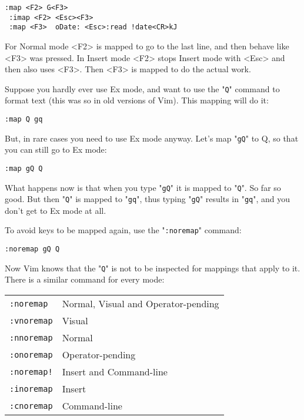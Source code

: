\begin{Verbatim}[samepage=true]
 :map <F2> G<F3>
 :imap <F2> <Esc><F3>
 :map <F3>  oDate: <Esc>:read !date<CR>kJ
\end{Verbatim}

For Normal mode <F2> is mapped to go to the last line, and then behave like <F3> was pressed.
In Insert mode <F2> stops Insert mode with <Esc> and then also uses <F3>.
Then <F3> is mapped to do the actual work.

Suppose you hardly ever use Ex mode, and want to use the "\texttt{Q}" command to format text (this was so in old versions of Vim).
This mapping will do it:

\begin{Verbatim}[samepage=true]
 :map Q gq
\end{Verbatim}

But, in rare cases you need to use Ex mode anyway.
Let's map "\texttt{gQ}" to Q, so that you can still go to Ex mode:

\begin{Verbatim}[samepage=true]
 :map gQ Q
\end{Verbatim}

What happens now is that when you type "\texttt{gQ}" it is mapped to "\texttt{Q}".
So far so good.
But then "\texttt{Q}" is mapped to "\texttt{gq}", thus typing "\texttt{gQ}" results in "\texttt{gq}", and you don't get to Ex mode at all.

To avoid keys to be mapped again, use the "\texttt{:noremap}" command:

\begin{Verbatim}[samepage=true]
 :noremap gQ Q
\end{Verbatim}

Now Vim knows that the "\texttt{Q}" is not to be inspected for mappings that apply to it.
There is a similar command for every mode:

\begin{center} \begin{tabular}{l l}
				\texttt{:noremap} & Normal, Visual and Operator-pending \\
				\texttt{:vnoremap} & Visual \\
				\texttt{:nnoremap} & Normal \\
				\texttt{:onoremap} & Operator-pending \\
				\texttt{:noremap!} & Insert and Command-line \\
				\texttt{:inoremap} & Insert \\
				\texttt{:cnoremap} & Command-line \\
\end{tabular} \end{center}
